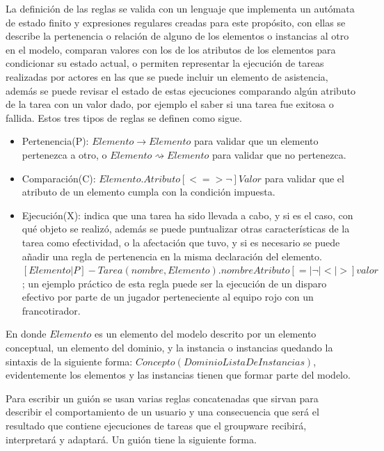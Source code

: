 La definici\'on de las reglas se valida con un lenguaje que implementa un aut\'omata de estado finito y expresiones regulares creadas para este prop\'osito, con ellas se describe la pertenencia o relaci\'on de alguno de los elementos o instancias al otro en el modelo, comparan valores con los de los atributos de los elementos para condicionar su estado actual, o permiten representar la ejecuci\'on de tareas realizadas por actores en las que se puede incluir un elemento de asistencia, adem\'as se puede revisar el estado de estas ejecuciones comparando alg\'un atributo de la tarea con un valor dado, por ejemplo el saber si una tarea fue exitosa o fallida. Estos tres tipos de reglas se definen como sigue.

\begin{itemize}
\item Pertenencia(P): $Elemento \rightarrow Elemento$ para validar que un elemento pertenezca a otro, o $Elemento \rightsquigarrow Elemento$ para validar que no pertenezca.

\item Comparaci\'on(C): $ Elemento.Atributo[<=>¬]Valor $ para validar que el atributo de un elemento cumpla con la condici\'on impuesta.

\item Ejecuci\'on(X): indica que una tarea ha sido llevada a cabo, y si es el caso, con qu\'e objeto se realiz\'o, adem\'as se puede puntualizar otras caracter\'isticas de la tarea como efectividad, o la afectaci\'on que tuvo, y si es necesario se puede a\~nadir una regla de pertenencia en la misma declaraci\'on del elemento.  $ [Elemento | P] - Tarea(nombre, Elemento).nombreAtributo [ = | \neg | < | > ] valor $; un ejemplo pr\'actico de esta regla puede ser la ejecuci\'on de un disparo efectivo por parte de un jugador perteneciente al equipo rojo con un francotirador.
\end{itemize}

En donde $Elemento$ es un elemento del modelo descrito por un elemento conceptual, un elemento del dominio, y la instancia o instancias quedando la sintaxis de la siguiente forma: $Concepto(Dominio{ListaDeInstancias})$, evidentemente los elementos y las instancias tienen que formar parte del modelo.

Para escribir un gui\'on se usan varias reglas concatenadas que sirvan para describir el comportamiento de un usuario y una consecuencia que ser\'a el resultado que contiene ejecuciones de tareas que el groupware recibir\'a, interpretar\'a y adaptar\'a. Un gui\'on tiene la siguiente forma.

